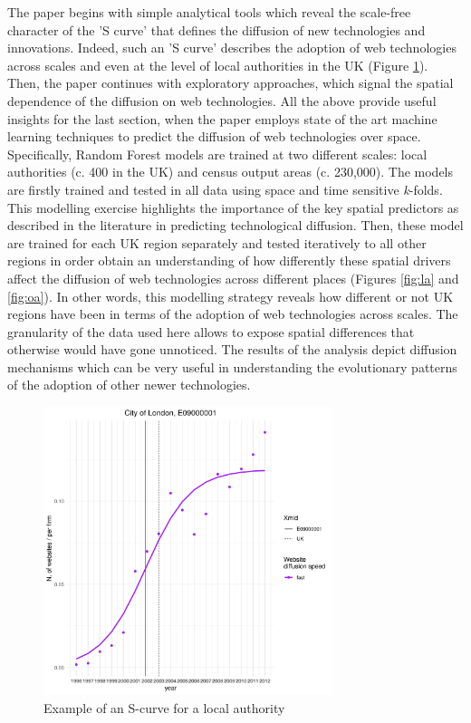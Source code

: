 \documentclass[11pt]{article}
\begin{document}
The paper begins with simple analytical tools which reveal the scale-free character of the 'S curve' that defines the diffusion of new technologies and innovations. Indeed, such an 'S curve' describes the adoption of web technologies across scales and even at the level of local authorities in the UK (Figure \ref{fig:s}). Then, the paper continues with exploratory approaches, which signal the spatial dependence of the diffusion on web technologies. All the above provide useful insights for the last section, when the paper employs state of the art machine learning techniques to predict the diffusion of web technologies over space. Specifically, Random Forest models are trained at two different scales: local authorities (c. 400 in the UK) and census output areas (c. 230,000). The models are firstly trained and tested in all data using space and time sensitive \emph{k}-folds. This modelling exercise highlights the importance of the key spatial predictors as described in the literature in predicting technological diffusion. Then, these model are trained for each UK region separately and tested iteratively to all other regions in order obtain an understanding of how differently these spatial drivers affect the diffusion of web technologies across different places (Figures \ref{fig:la} and \ref{fig:oa}). In other words, this modelling strategy reveals how different or not UK regions have been in terms of the adoption of web technologies across scales. The granularity of the data used here allows to expose spatial differences that otherwise would have gone unnoticed. The results of the analysis depict diffusion mechanisms which can be very useful in understanding the evolutionary patterns of the adoption of other newer technologies.

\begin{figure}[h]
    \centering
    \includegraphics[width=0.75\textwidth]{lad_E09000001}
    \caption{Example of an S-curve for a local authority}
    \label{fig:s}
\end{figure}
\end{document}
